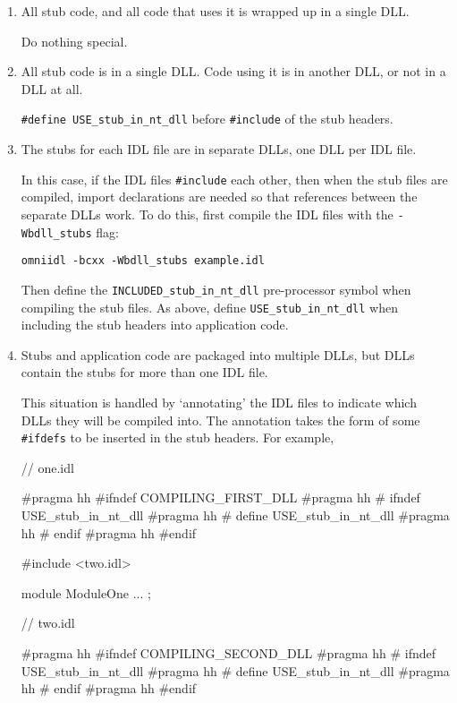 \documentclass[11pt,oneside,a4paper]{book}
\newcommand{\code}[1]{\texttt{#1}}
\newcommand{\cmdline}[1]{\texttt{#1}}
\begin{document}
\begin{enumerate}

\item All stub code, and all code that uses it is wrapped up in a
      single DLL.

      Do nothing special.

\item All stub code is in a single DLL. Code using it is in another
      DLL, or not in a DLL at all.

      \code{\#define USE\_stub\_in\_nt\_dll} before \code{\#include} of
      the stub headers.

\item The stubs for each IDL file are in separate DLLs, one DLL per
      IDL file.

      In this case, if the IDL files \code{\#include} each other, then
      when the stub files are compiled, import declarations are needed
      so that references between the separate DLLs work. To do this,
      first compile the IDL files with the \cmdline{-Wbdll\_stubs}
      flag:

      \cmdline{omniidl -bcxx -Wbdll\_stubs example.idl}

      Then define the \code{INCLUDED\_stub\_in\_nt\_dll} pre-processor
      symbol when compiling the stub files. As above, define
      \code{USE\_stub\_in\_nt\_dll} when including the stub headers
      into application code.

\item Stubs and application code are packaged into multiple DLLs, but
      DLLs contain the stubs for more than one IDL file.

      This situation is handled by `annotating' the IDL files to
      indicate which DLLs they will be compiled into. The annotation
      takes the form of some \code{\#ifdefs} to be inserted in the
      stub headers. For example,

\begin{idllisting}
// one.idl

#pragma hh #ifndef COMPILING_FIRST_DLL
#pragma hh # ifndef USE_stub_in_nt_dll
#pragma hh #   define USE_stub_in_nt_dll
#pragma hh # endif
#pragma hh #endif

#include <two.idl>

module ModuleOne {
  ...
};


// two.idl

#pragma hh #ifndef COMPILING_SECOND_DLL
#pragma hh # ifndef USE_stub_in_nt_dll
#pragma hh #   define USE_stub_in_nt_dll
#pragma hh # endif
#pragma hh #endif


\end{idllisting}
\end{enumerate}
\end{document}
